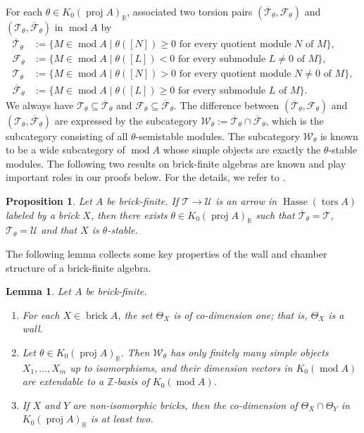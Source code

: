 \documentclass{amsart}
\theoremstyle{thmstyle}
\newtheorem{lemma}[thm]{Lemma}
\newtheorem{prop}[thm]{Proposition}
\theoremstyle{exstyle}
\theoremstyle{defstyle}
\theoremstyle{remstyle}
\theoremstyle{remstyle}
\DeclareMathOperator*{\modu}{mod}
\DeclareMathOperator*{\proj}{proj}
\DeclareMathOperator*{\brick}{brick}
\DeclareMathOperator*{\tors}{tors}
\DeclareMathOperator*{\Hasse}{Hasse}
\begin{document}
For each $\theta \in K_0(\proj A)_\mathbb{R}$, \cite{BKT} associated two torsion pairs $(\overline{\mathcal{T}}_\theta,\mathcal{F}_\theta)$ and $(\mathcal{T}_\theta,\overline{\mathcal{F}}_\theta)$ in $\modu A$ by
\begin{align*}
\overline{\mathcal{T}}_\theta&:=\{M \in \modu A \mid \text{$\theta([N]) \ge 0$ for every quotient module $N$ of $M$}\},\\
\mathcal{F}_\theta&:=\{M \in \modu A \mid \text{$\theta([L]) <0$ for every submodule $L \ne 0$ of $M$}\},\\
\mathcal{T}_\theta&:=\{M \in \modu A \mid \text{$\theta([N]) >0$ for every quotient module $N \ne 0$ of $M$}\}, \\
\overline{\mathcal{F}}_\theta&:=\{M \in \modu A \mid \text{$\theta([L]) \ge 0$ for every submodule $L$ of $M$}\}.
\end{align*}
We always have $\mathcal{T}_\theta \subseteq \overline{\mathcal{T}}_\theta$ and $\mathcal{F}_\theta \subseteq \overline{\mathcal{F}}_\theta$. The difference between $(\overline{\mathcal{T}}_\theta,\mathcal{F}_\theta)$ and $(\mathcal{T}_\theta,\overline{\mathcal{F}}_\theta)$ are expressed by the subcategory $\mathcal{W}_\theta:=\overline{\mathcal{T}}_\theta \cap \overline{\mathcal{F}}_\theta$, which is the subcategory consisting of all $\theta$-semistable modules. The subcategory $\mathcal{W}_\theta$ is known to be a wide subcategory of $\modu A$ whose simple objects are exactly the $\theta$-stable modules. The following two results on brick-finite algebras are known and play important roles in our proofs below. For the details, we refer to \cite{As-smc}. 

 \begin{prop}\label{Prop: functorially finite torsion pairs are semistable}
     Let $A$ be brick-finite. If $\mathcal{T} \to \mathcal{U}$ is an arrow in $\Hasse(\tors A)$ labeled by a brick $X$, then there exists $\theta \in K_0(\proj A)_\mathbb{R}$ such that $\overline{\mathcal{T}}_\theta=\mathcal{T}$, $\mathcal{T}_\theta=\mathcal{U}$ and that $X$ is $\theta$-stable.
 \end{prop}

 The following lemma collects some key properties of the wall and chamber structure of a brick-finite algebra.

\begin{lemma} \label{Lemma: relative-interior of walls}
    Let $A$ be brick-finite. 
    \begin{enumerate}
    \item 
    For each $X \in \brick A$, the set $\Theta_X$ is of co-dimension one; that is, $\Theta_X$ is a wall.
    \item 
    Let $\theta \in K_0(\proj A)_\mathbb{R}$. Then $\mathcal{W}_\theta$ has only finitely many simple objects $X_1,\ldots,X_m$ up to isomorphisms, and their dimension vectors in $K_0(\modu A)$ are extendable to a $\mathbb{Z}$-basis of $K_0(\modu A)$.
    \item
    If $X$ and $Y$ are non-isomorphic bricks, then the co-dimension of $\Theta_X \cap \Theta_Y$ in $K_0(\proj A)_\mathbb{R}$ is at least two.
    \end{enumerate}
\end{lemma}
\end{document}
